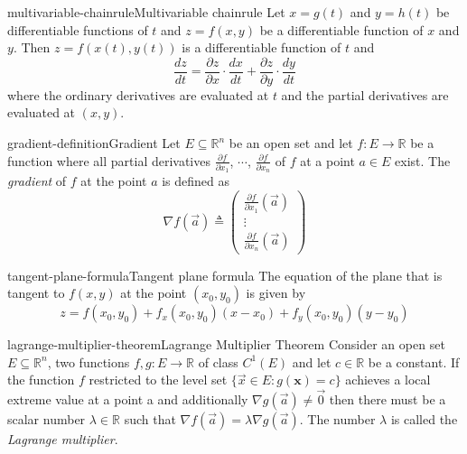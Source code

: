 \documentclass[preview]{standalone}
\begin{document}
\genpage

\begin{snippettheorem}{multivariable-chainrule}{Multivariable chainrule}
    Let \(x=g(t)\) and \(y=h(t)\) be differentiable functions of \(t\)
    and \(z=f(x,y)\) be a differentiable function of \(x\) and \(y\).
    Then \(z=f(x(t), y(t))\) is a differentiable function of \(t\) and
    \[
        \frac{dz}{dt} =
        \frac{\partial z}{\partial x} \cdot \frac{dx}{dt} +
        \frac{\partial z}{\partial y} \cdot \frac{dy}{dt}
    \]
    where the ordinary derivatives are evaluated at \(t\) and the partial
    derivatives are evaluated at \((x,y)\).
\end{snippettheorem}

\begin{snippetdefinition}{gradient-definition}{Gradient}
    Let \(E \subseteq {\mathbb{R}}^n\) be an open set and
    let \(f\colon E \to \mathbb{R}\) be a function where
    all partial derivatives \(\frac{\partial f}{\partial x_1}\),
    \(\cdots\), \(\frac{\partial f}{\partial x_n}\) of \(f\)
    at a point \(a\in E\) exist.
    The \textit{gradient} of \(f\) at the point \(a\)
    is defined as
    \[
        \nabla f(\vec{a}) \triangleq
        \left(\begin{array}{c}
        \frac{\partial f}{\partial x_1}(\vec{a}) \\
        \vdots \\
        \frac{\partial f}{\partial x_n}(\vec{a})
        \end{array}\right)
    \]
\end{snippetdefinition}

\begin{snippetproposition}{tangent-plane-formula}{Tangent plane formula}
    The equation of the plane that is tangent to \(f(x,y)\)
    at the point \((x_0, y_0)\) is given by
    \[
        z = f(x_0, y_0) + f_x(x_0, y_0)(x-x_0) + f_y(x_0, y_0)(y-y_0)
    \]
\end{snippetproposition}



\begin{snippettheorem}{lagrange-multiplier-theorem}{Lagrange Multiplier Theorem}
    Consider an open set $E \subseteq \mathbb{R}^n$, two functions $f, g: E \rightarrow \mathbb{R}$
    of class $C^1(E)$ and let $c \in \mathbb{R}$ be a constant.
    If the function $f$ restricted to the level set $\{\vec{x} \in E: g(\mathbf{x})=c\}$
    achieves a local extreme value at a point a and additionally
    $\nabla g(\vec{a}) \neq \vec{0}$ then there must be a scalar
    number $\lambda \in \mathbb{R}$ such that
    $\nabla f(\vec{a})=\lambda \nabla g(\vec{a})$. 
    The number $\lambda$ is called the \textit{Lagrange multiplier}.
\end{snippettheorem}


\end{document}
